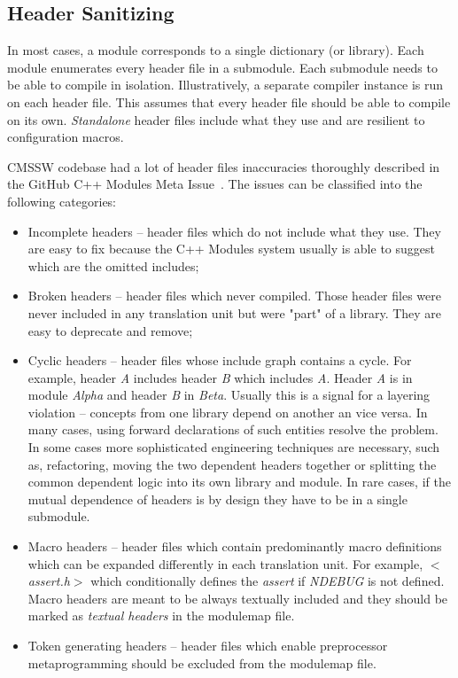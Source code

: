 \documentclass[12pt]{iopart}
\begin{document}
\subsection{Header Sanitizing}
In most cases, a module corresponds to a single dictionary (or library). Each module enumerates every header file in a submodule. Each submodule needs to be able to compile in isolation. Illustratively, a separate compiler instance is run on each header file. This assumes that every header file should be able to compile on its own. \textit{Standalone} header files include what they use and are resilient to configuration macros.

CMSSW codebase had a lot of header files inaccuracies thoroughly described in the GitHub C++ Modules Meta Issue~\cite{Modules-gh-metaissue}. The issues can be classified into the following categories:
\begin{itemize}
    \item Incomplete headers -- header files which do not include what they use. They are easy to fix because the C++ Modules system usually is able to suggest which are the omitted includes;
    \item Broken headers -- header files which never compiled. Those header files were never included in any translation unit but were "part" of a library. They are easy to deprecate and remove;
    \item Cyclic headers -- header files whose include graph contains a cycle. For example, header \textit{A} includes header \textit{B} which includes \textit{A}. Header \textit{A} is in module \textit{Alpha} and header \textit{B} in \textit{Beta}. Usually this is a signal for a layering violation -- concepts from one library depend on another an vice versa. In many cases, using forward declarations of such entities resolve the problem. In some cases more sophisticated engineering techniques are necessary, such as, refactoring, moving the two dependent headers together or splitting the common dependent logic into its own library and module. In rare cases, if the mutual dependence of headers is by design they have to be in a single submodule.
    \item Macro headers -- header files which contain predominantly macro definitions which can be expanded differently in each translation unit. For example, \textit{$<$assert.h$>$} which conditionally defines the \textit{assert} if \textit{NDEBUG} is not defined. Macro headers are meant to be always textually included and they should be marked as \textit{textual headers} in the modulemap file. 
    \item Token generating headers -- header files which enable preprocessor metaprogramming should be excluded from the modulemap file.
\end{itemize}
\end{document}
